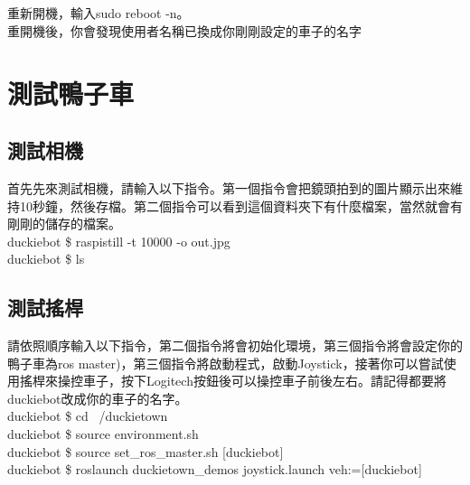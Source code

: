 \documentclass{article}
\begin{document}
\\
\\\\\\\\\\\\重新開機，輸入sudo reboot -n。
\\重開機後，你會發現使用者名稱已換成你剛剛設定的車子的名字

\newpage
\section{測試鴨子車}
\subsection{測試相機}
首先先來測試相機，請輸入以下指令。第一個指令會把鏡頭拍到的圖片顯示出來維持10秒鐘，然後存檔。第二個指令可以看到這個資料夾下有什麼檔案，當然就會有剛剛的儲存的檔案。
\\duckiebot \$ raspistill -t 10000 -o out.jpg
\\duckiebot \$ ls

\subsection{測試搖桿}
請依照順序輸入以下指令，第二個指令將會初始化環境，第三個指令將會設定你的鴨子車為ros master)，第三個指令將啟動程式，啟動Joystick，接著你可以嘗試使用搖桿來操控車子，按下Logitech按鈕後可以操控車子前後左右。請記得都要將duckiebot改成你的車子的名字。
\\duckiebot \$ cd ~/duckietown
\\duckiebot \$ source environment.sh
\\duckiebot \$ source set\_ros\_master.sh [duckiebot]
\\duckiebot \$ roslaunch duckietown\_demos joystick.launch veh:=[duckiebot]
\end{document}
